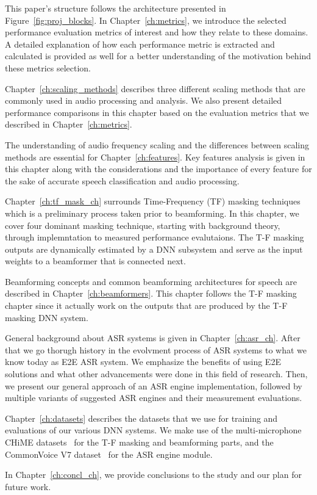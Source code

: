 This paper's structure follows the architecture
presented in Figure~\ref{fig:proj_blocks}.
In Chapter~\ref{ch:metrics}, 
we introduce the selected performance evaluation metrics
of interest and how they relate to these domains. 
A detailed explanation of how each performance metric is
extracted and calculated is provided as well
for a better understanding of the motivation behind
these metrics selection.

Chapter~\ref{ch:scaling_methods} describes three different scaling methods
that are commonly used in audio processing and analysis.
We also present detailed performance comparisons in this chapter based on
the evaluation metrics that we described in Chapter~\ref{ch:metrics}.

The understanding of audio frequency scaling and 
the differences between scaling methods
are essential for Chapter~\ref{ch:features}. 
Key features analysis is given in this chapter along with
the considerations and the importance of every feature
for the sake of accurate speech classification and audio processing. 

Chapter~\ref{ch:tf_mask_ch} surrounds Time-Frequency (TF) 
masking techniques which is a preliminary process taken prior
to beamforming. 
In this chapter, we cover four
dominant masking technique, starting with background theory,
through implemntation to measured performance evalutaions.
The T-F masking outputs are dynamically estimated
by a DNN subsystem 
and serve as the input weights
to a beamformer that is connected next.

Beamforming concepts and 
common beamforming architectures for speech
are described in Chapter~\ref{ch:beamformers}.
This chapter follows the T-F masking chapter
since it actually work on the outputs that are produced
by the T-F masking DNN system.

General background about 
ASR systems is given in
Chapter~\ref{ch:asr_ch}.
After that we go thorugh history in the evolvment process
of ASR systems to what we know today as E2E ASR system.
We emphasize the benefits of using E2E solutions
and what other advancements were done in this field of research.
Then, we present our general approach of an ASR engine implementation,
followed by multiple variants of 
suggested ASR engines and their measurement evaluations.

Chapter~\ref{ch:datasets} describes the datasets that
we use for training and evaluations of our various
DNN systems. We make use of the multi-microphone CHiME datasets~\cite{chime3DS}
for the T-F masking and beamforming parts, 
and the CommonVoice V7 dataset~\cite{commonVoiceDS}
for the ASR engine module.

In Chapter~\ref{ch:concl_ch}, we provide conclusions to the study
and our plan for future work.